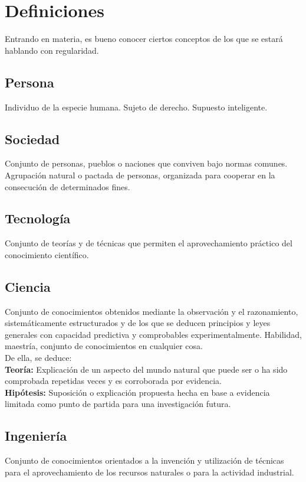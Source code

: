 \section*{Definiciones}

Entrando en materia, es bueno conocer ciertos conceptos de
los que se estará hablando con regularidad.

\subsection*{Persona}
Individuo de la especie humana. Sujeto de derecho. Supuesto
inteligente.

\subsection*{Sociedad}
Conjunto de personas, pueblos o naciones que conviven bajo
normas comunes. Agrupación natural o pactada de personas,
organizada para cooperar en la consecución de determinados
fines.

\subsection*{Tecnología}
Conjunto de teorías y de técnicas que permiten el
aprovechamiento práctico del conocimiento científico.

\subsection*{Ciencia}
Conjunto de conocimientos obtenidos mediante la observación
y el razonamiento, sistemáticamente estructurados y de los
que se deducen principios y leyes generales con capacidad
predictiva y comprobables experimentalmente. Habilidad,
maestría, conjunto de conocimientos en cualquier cosa.\\

De ella, se deduce: \\

\textbf{Teoría:} Explicación de un aspecto del mundo natural
que puede ser o ha sido comprobada repetidas veces y es
corroborada por evidencia. \\

\textbf{Hipótesis:} Suposición o explicación propuesta hecha
en base a evidencia limitada como punto de partida para una
investigación futura.

\subsection*{Ingeniería}
Conjunto de conocimientos orientados a la invención y
utilización de técnicas para el aprovechamiento de los
recursos naturales o para la actividad industrial. \\

